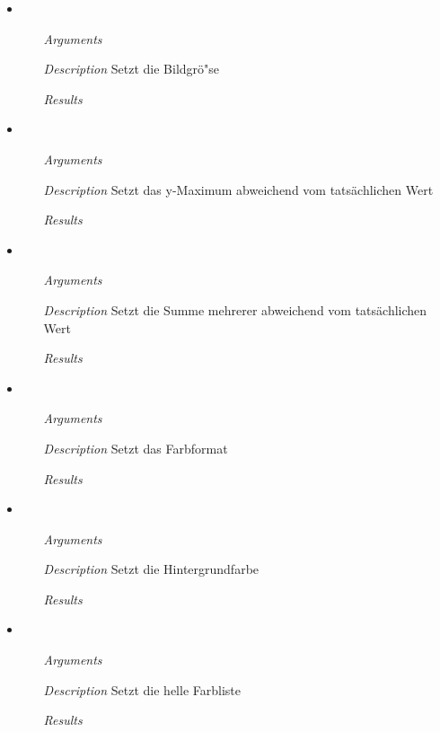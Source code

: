 \begin{itemize}
\item {}
\begin{enumerate}
\item[\textit{Arguments}] 
\item[\textit{Description}] Setzt die Bildgr\"o"se
\item[\textit{Results}] 
\end{enumerate}

\item {}
\begin{enumerate}
\item[\textit{Arguments}] 
\item[\textit{Description}] Setzt das y-Maximum abweichend vom
  tats\"achlichen Wert
\item[\textit{Results}] 
\end{enumerate}

\item {}
\begin{enumerate}
\item[\textit{Arguments}] 
\item[\textit{Description}] Setzt die Summe mehrerer 
  abweichend vom tats\"achlichen Wert
\item[\textit{Results}] 
\end{enumerate}

\item {}
\begin{enumerate}
\item[\textit{Arguments}] 
\item[\textit{Description}] Setzt das Farbformat
\item[\textit{Results}] 
\end{enumerate}

\item {}
\begin{enumerate}
\item[\textit{Arguments}] 
\item[\textit{Description}] Setzt die Hintergrundfarbe
\item[\textit{Results}] 
\end{enumerate}

\item {}
\begin{enumerate}
\item[\textit{Arguments}] 
\item[\textit{Description}] Setzt die helle Farbliste
\item[\textit{Results}] 
\end{enumerate}


\end{itemize}
